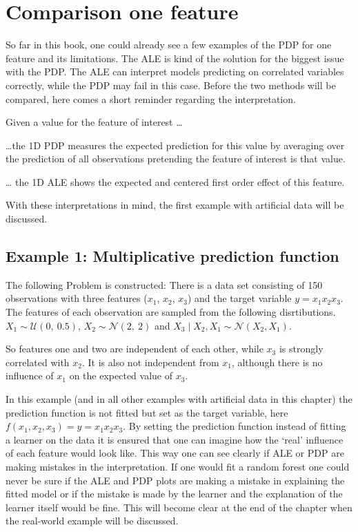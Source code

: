 \documentclass[]{krantz}
\begin{document}
\section{Comparison one feature}\label{comparison-one-feature}

So far in this book, one could already see a few examples of the PDP for
one feature and its limitations. The ALE is kind of the solution for the
biggest issue with the PDP. The ALE can interpret models predicting on
correlated variables correctly, while the PDP may fail in this case.
Before the two methods will be compared, here comes a short reminder
regarding the interpretation.

Given a value for the feature of interest \ldots{}

\ldots{}the 1D PDP measures the expected prediction for this value by
averaging over the prediction of all observations pretending the feature
of interest is that value.

\ldots{} the 1D ALE shows the expected and centered first order effect
of this feature.

With these interpretations in mind, the first example with artificial
data will be discussed.

\subsection{Example 1: Multiplicative prediction
function}\label{example-1-multiplicative-prediction-function}

The following Problem is constructed: There is a data set consisting of
150 observations with three features (\(x_1\), \(x_2\), \(x_3\)) and the
target variable \(y = x_1 x_2 x_3\). The features of each observation
are sampled from the following disrtibutions.
\(X_1 \sim \mathcal{U}(0,~0.5)\), \(X_2 \sim \mathcal{N}(2,~2)\) and
\(X_3\mid X_2, X_1 \sim \mathcal{N}(X_2,X_1)\).

So features one and two are independent of each other, while \(x_3\) is
strongly correlated with \(x_2\). It is also not independent from
\(x_1\), although there is no influence of \(x_1\) on the expected value
of \(x_3\).

In this example (and in all other examples with artificial data in this
chapter) the prediction function is not fitted but set as the target
variable, here \(f(x_1, x_2, x_3) = y = x_1 x_2 x_3\). By setting the
prediction function instead of fitting a learner on the data it is
ensured that one can imagine how the `real' influence of each feature
would look like. This way one can see clearly if ALE or PDP are making
mistakes in the interpretation. If one would fit a random forest one
could never be sure if the ALE and PDP plots are making a mistake in
explaining the fitted model or if the mistake is made by the learner and
the explanation of the learner itself would be fine. This will become
clear at the end of the chapter when the real-world example will be
discussed.
\end{document}
